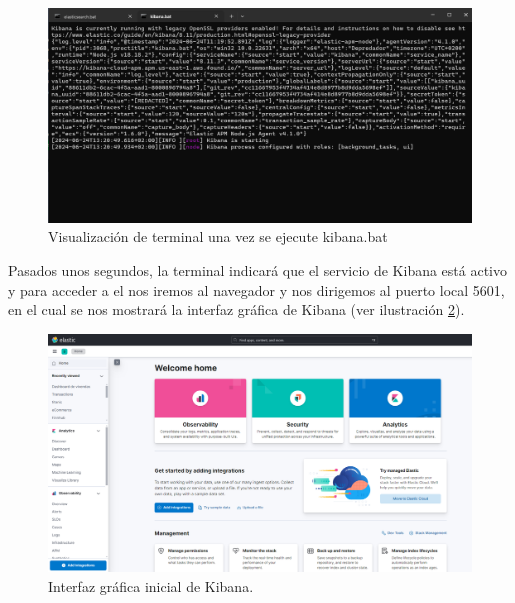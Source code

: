 \begin{figure}
    \centering
    \includegraphics[width=1\linewidth]{img/kibanaa1.png}
    \caption{Visualización de terminal una vez se ejecute kibana.bat}
    \label{fig:kibana1}
\end{figure}

Pasados unos segundos, la terminal indicará que el servicio de Kibana está activo y para acceder a el nos iremos al navegador y nos dirigemos al puerto local 5601, en el cual se nos mostrará la interfaz gráfica de Kibana (ver ilustración  \ref{fig:kibana2}).

\begin{figure}
    \centering
    \includegraphics[width=1\linewidth]{img/kibana2.png}
    \caption{Interfaz gráfica inicial de Kibana.}
    \label{fig:kibana2}
\end{figure}

\paragraph{}
\paragraph{}

